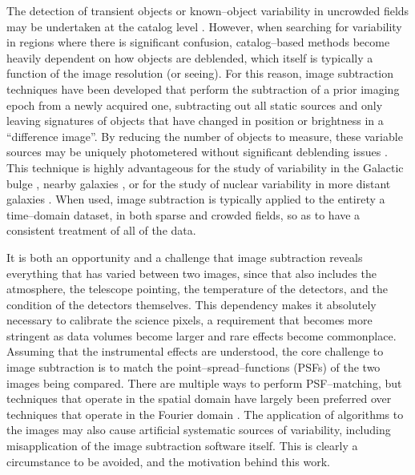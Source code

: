 \documentclass[iop]{emulateapj}
\begin{document}
The detection of transient objects or known--object variability in uncrowded fields may be undertaken at the catalog level \cite{drake}.
However, when searching for variability in regions where there is significant confusion, catalog--based methods become heavily dependent on how objects are deblended, which itself is typically a function of the image resolution (or seeing).
For this reason, image subtraction techniques have been developed that perform the subtraction of a prior imaging epoch from a newly acquired one, subtracting out all static sources and only leaving signatures of objects that have changed in position or brightness in a ``difference image''.
By reducing the number of objects to measure, these variable sources may be uniquely photometered without significant deblending issues \citep[however, crowded difference images with spatially overlapping variable sources are possible, e.g.][]{m31}.
This technique is highly advantageous for the study of variability in the Galactic bulge \citep[e.g. microlensing;][]{microlensing}, nearby galaxies \citep[e.g. nearby supernovae;][]{nearby-sne}, or for the study of nuclear variability in more distant galaxies \cite[e.g.][]{yumi}.
When used, image subtraction is typically applied to the entirety a time--domain dataset, in both sparse and crowded fields, so as to have a consistent treatment of all of the data.

It is both an opportunity and a challenge that image subtraction reveals everything that has varied between two images, since that also includes the atmosphere, the telescope pointing, the temperature of the detectors, and the condition of the detectors themselves.
This dependency makes it absolutely necessary to calibrate the science pixels, a requirement that becomes more stringent as data volumes become larger and rare effects become commonplace.
Assuming that the instrumental effects are understood, the core challenge to image subtraction is to match the point--spread--functions (PSFs) of the two images being compared.
There are multiple ways to perform PSF--matching, but techniques that operate in the spatial domain \citep{alard-lupton,alard} have largely been preferred over techniques that operate in the Fourier domain \citep{tomaney-crotts}.
The application of algorithms to the images may also cause artificial systematic sources of variability, including misapplication of the image subtraction software itself.
This is clearly a circumstance to be avoided, and the motivation behind this work.
\end{document}
